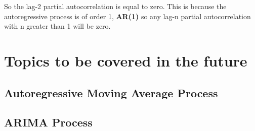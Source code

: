 So the lag-2 partial autocorrelation is equal to zero. This is because the
autoregressive process is of order 1, \textbf{AR(1)} so any lag-n partial
autocorrelation with n greater than 1 will be zero.

\section{Topics to be covered in the future}

\subsection{Autoregressive Moving Average Process}
\subsection{ARIMA Process}
